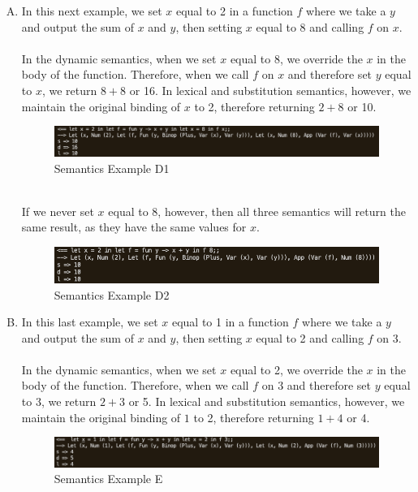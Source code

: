 \documentclass{article}
\begin{document}
\begin{enumerate}[A.]
\item In this next example, we set $x$ equal to 2 in a function $f$ where we take a $y$ and output the sum of $x$ and $y$, then setting $x$ equal to 8 and calling $f$ on $x$. \\\\
In the dynamic semantics, when we set $x$ equal to 8, we override the $x$ in the body of the function. Therefore, when we call $f$ on $x$ and therefore set $y$ equal to $x$, we return $8+8$ or 16. In lexical and substitution semantics, however, we maintain the original binding of $x$ to 2, therefore returning $2+8$ or 10.
\begin{figure}[h]\begin{center}
    \includegraphics[width =\textwidth]{lddiff4.png}
    \caption{Semantics Example D1}
\end{center} \end{figure}
\\
If we never set $x$ equal to 8, however, then all three semantics will return the same result, as they have the same values for $x$.
\begin{figure}[h]\begin{center}
    \includegraphics[width =\textwidth]{lddiff4a.png}
    \caption{Semantics Example D2}
\end{center} \end{figure}
\item
In this last example, we set $x$ equal to 1 in a function $f$ where we take a $y$ and output the sum of $x$ and $y$, then setting $x$ equal to 2 and calling $f$ on $3$. \\\\
In the dynamic semantics, when we set $x$ equal to 2, we override the $x$ in the body of the function. Therefore, when we call $f$ on $3$ and therefore set $y$ equal to $3$, we return $2+3$ or 5. In lexical and substitution semantics, however, we maintain the original binding of $1$ to 2, therefore returning $1+4$ or 4.
\begin{figure}[h]\begin{center}
    \includegraphics[width =\textwidth]{lddiff5.png}
    \caption{Semantics Example E}
\end{center} \end{figure}
\end{enumerate}
\end{document}
